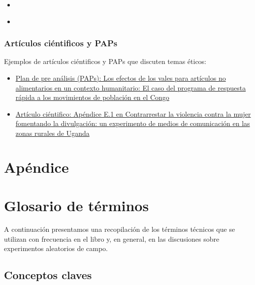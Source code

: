 \documentclass[12pt,spanish,]{book}
\begin{document}
\begin{itemize}
\item
  \autocite{Asieduetal2021ethics}
\item
  \autocite{Evans2021ethics} 
\end{itemize}

\hypertarget{artuxedculos-ciuxe9ntificos-y-paps}{%
\subsection{Artículos ciéntificos y PAPs}\label{artuxedculos-ciuxe9ntificos-y-paps}}

Ejemplos de artículos ciéntificos y PAPs que discuten temas éticos:

\begin{itemize}
\item
  \href{https://osf.io/eutx7/}{Plan de pre análisis (PAPs): Los efectos de los vales para artículos no alimentarios en un contexto humanitario: El caso del programa de respuesta rápida a los movimientos de población en el Congo}
\item
  \href{http://jasper-cooper.com/papers/Green_et_al.pdf}{Artículo ciéntifico: Apéndice E.1 en Contrarrestar la violencia contra la mujer fomentando la divulgación: un experimento de medios de comunicación en las zonas rurales de Uganda}
\end{itemize}

\cleardoublepage

\hypertarget{apuxe9ndice}{%
\chapter*{Apéndice}\label{apuxe9ndice}}

\hypertarget{glosario-de-tuxe9rminos}{%
\chapter{Glosario de términos}\label{glosario-de-tuxe9rminos}}

A continuación presentamos una recopilación de los términos técnicos que se utilizan con frecuencia en el libro y, en general, en las discusiones sobre experimentos aleatorios de campo.

\hypertarget{conceptos-claves}{%
\section{Conceptos claves}\label{conceptos-claves}}
\end{document}
